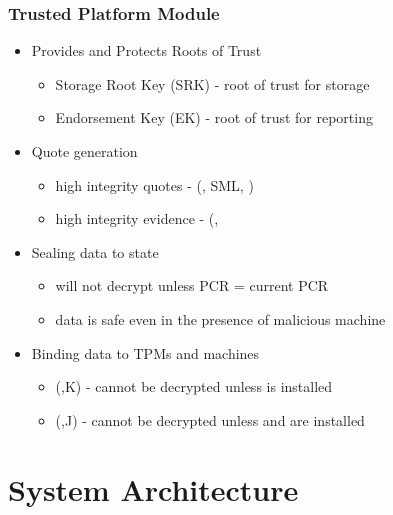 \documentclass{beamer}
\begin{document}
\begin{frame}
  \frametitle{Trusted Platform Module}
  \begin{itemize}
  \item Provides and Protects Roots of Trust
    \begin{itemize}
    \item Storage Root Key (SRK) - root of trust for storage
    \item Endorsement Key (EK) - root of trust for reporting
    \end{itemize}
  \item Quote generation
    \begin{itemize}
    \item high integrity quotes - (, SML, )
    \item high integrity evidence - (, 
    \end{itemize}
  \item Sealing data to state
    \begin{itemize}
    \item {} will not decrypt unless PCR = current PCR
    \item data is safe even in the presence of malicious machine
    \end{itemize}
  \item Binding data to TPMs and machines
    \begin{itemize}
    \item (,K) -  cannot be decrypted unless  is installed
    \item (,J) -  cannot be decrypted
      unless  and  are installed
    \end{itemize}
  \end{itemize}
\end{frame}

\section{System Architecture}
\end{document}
